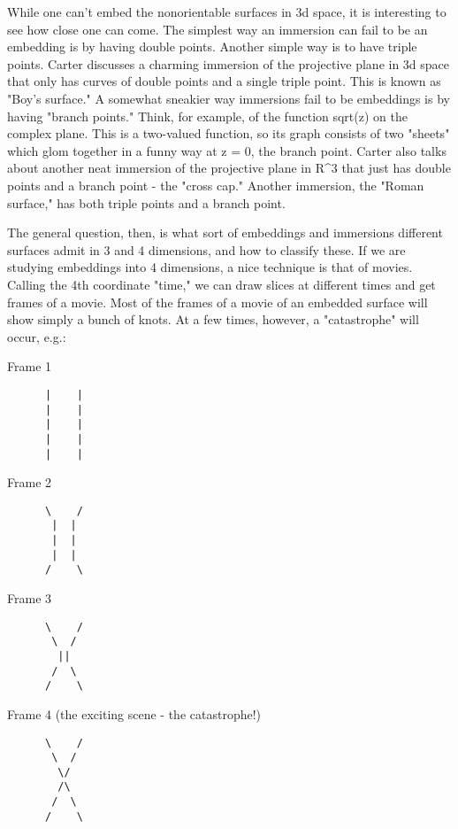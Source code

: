 While one can't embed the nonorientable surfaces in 3d space, it is
interesting to see how close one can come.  The simplest way an
immersion can fail to be an embedding is by having double points.  
Another simple way is to have triple points.  Carter discusses a
charming immersion of the projective plane in 3d space that only has
curves of double points and a single triple point.  This is known as
"Boy's surface."  A somewhat sneakier way immersions fail to be
embeddings is by having "branch points."  Think, for example, of the
function sqrt(z) on the complex plane.  This is a two-valued function,
so its graph consists of two "sheets" which glom together in a funny
way at z = 0, the branch point.  Carter also talks about another neat
immersion of the projective plane in R^3 that just has double points and
a branch point - the "cross cap."  Another immersion, the "Roman
surface," has both triple points and a branch point.  

The general question, then, is what sort of embeddings and immersions
different surfaces admit in 3 and 4 dimensions, and how to classify
these.  If we are studying embeddings into 4 dimensions, a nice
technique is that of movies.  Calling the 4th coordinate "time," we can
draw slices at different times and get frames of a movie.  Most of the
frames of a movie of an embedded surface will show simply a bunch of
knots.  At a few times, however, a "catastrophe" will occur, e.g.:

Frame 1

\begin{verbatim}
      |    |
      |    |
      |    |
      |    |
      |    |
\end{verbatim}
    

Frame 2 

\begin{verbatim}
      \    /
       |  |
       |  |
       |  |
      /    \
\end{verbatim}
    

Frame 3

\begin{verbatim}
      \    /
       \  /
        ||
       /  \
      /    \
\end{verbatim}
    

Frame 4 (the exciting scene - the catastrophe!)

\begin{verbatim}
      \    /
       \  /
        \/
        /\
       /  \
      /    \
\end{verbatim}
    

